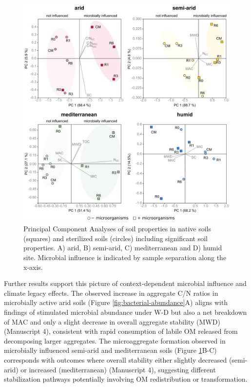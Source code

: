 \begin{figure}[h!]
	\centering
	\includegraphics[width=1\textwidth]{img/PCA-microbes-structure.jpg}
	\caption[Principal Component Analyses of soil properties in native and sterilized soils including significant soil properties]{Principal Component Analyses of soil properties in native soils (squares) and sterilized soils (circles) including significant soil properties. A) arid, B) semi-arid, C) mediterranean and D) humid site. Microbial influence is indicated by sample separation along the x-axis.}
	\label{fig:PCA-microbes}
\end{figure}

\FloatBarrier

Further results support this picture of context-dependent microbial influence and climate legacy effects. The observed increase in aggregate C/N ratios in microbially active arid soils (Figure \ref{fig:bacterial-abundance}A) aligns with findings of stimulated microbial abundance under W-D but also a net breakdown of MAC and only a slight decrease in overall aggregate stability (MWD) (Manuscript 4), consistent with rapid consumption of labile OM released from decomposing larger aggregates. The microaggregate formation observed in microbially influenced semi-arid and mediterranean soils (Figure \ref{fig:PCA-microbes}B-C) corresponds with outcomes where overall stability either slightly decreased (semi-arid) or increased (mediterranean) (Manuscript 4), suggesting different stabilization pathways potentially involving OM redistribution or transformation.

